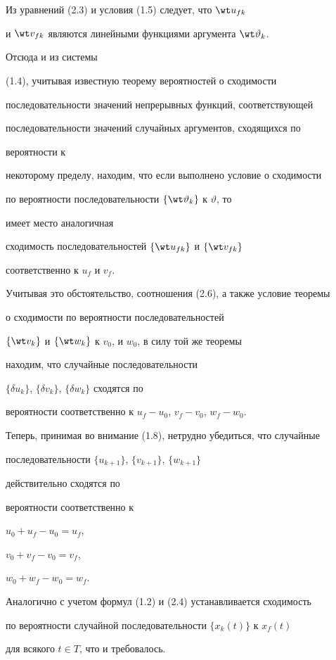 \begin{pf} Из уравнений (2.3) и условия (1.5) следует, что $\wt u_{fk}$


и $\wt v_{fk}$ являются линейными функциями аргумента $\wt\vartheta_k$. 


Отсюда и из системы 


(1.4), учитывая известную теорему вероятностей о сходимости 


последовательности значений непрерывных функций, соответствующей 


последовательности значений случайных аргументов, сходящихся по 


вероятности к 


некоторому пределу, находим, что если выполнено условие о сходимости 


по вероятности последовательности $\{\wt\vartheta_k\}$ к $\vartheta$, то 


имеет место аналогичная 


сходимость последовательностей $\{\wt u_{fk}\}$ и $\{\wt v_{fk}\}$ 


соответственно к $u_f$ и $v_f$. 


 


Учитывая это обстоятельство, соотношения (2.6), а также условие теоремы 


о сходимости по вероятности последовательностей 


$\{\wt v_k\}$ и $\{\wt w_k\}$ к $v_0$, и $w_0$, в силу той же теоремы 


находим, что случайные последовательности 


$\{\delta u_k\}$, $\{\delta v_k\}$, $\{\delta w_k\}$ сходятся по 


вероятности соответственно к $u_f-u_0$, $v_f-v_0$, $w_f-w_0$. 


 


Теперь, принимая во внимание (1.8), нетрудно убедиться, что случайные 


последовательности $\{u_{k+1}\}$, $\{v_{k+1}\}$, $\{w_{k+1}\}$ 


действительно сходятся по 


вероятности соответственно к 


$u_0+u_f-u_0=u_f$, 


$v_0+v_f-v_0=v_f$, 


$w_0+w_f-w_0=w_f$. 


 


Аналогично с учетом формул (1.2) и (2.4) устанавливается сходимость 


по вероятности случайной последовательности $\{x_k(t)\}$ к $x_f(t)$ 


для всякого $t\in T$, что и требовалось. 


\end{pf} 


